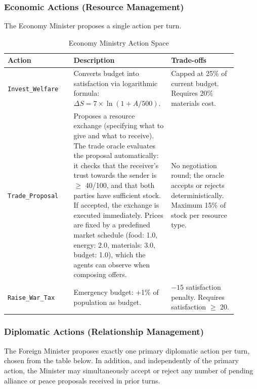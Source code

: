 \subsubsection{Economic Actions (Resource Management)}
The Economy Minister proposes a single action per turn.
\begin{table}[H]
\centering
\begin{tabular}{|p{0.27\linewidth}|p{0.36\linewidth}|p{0.27\linewidth}|}
\hline
\textbf{Action} & \textbf{Description} & \textbf{Trade-offs} \\ \hline
\texttt{Invest\_Welfare} & Converts budget into satisfaction via logarithmic formula: $\Delta S = 7 \times \ln(1 + A/500)$. & Capped at 25\% of current budget. Requires 20\% materials cost. \\ \hline
\texttt{Trade\_Proposal} & Proposes a resource exchange (specifying what to give and what to receive). The trade oracle evaluates the proposal automatically: it checks that the receiver's trust towards the sender is $\geq$ 40/100, and that both parties have sufficient stock. If accepted, the exchange is executed immediately. Prices are fixed by a predefined market schedule (food: 1.0, energy: 2.0, materials: 3.0, budget: 1.0), which the agents can observe when composing offers. & No negotiation round; the oracle accepts or rejects deterministically. Maximum 15\% of stock per resource type. \\ \hline
\texttt{Raise\_War\_Tax} & Emergency budget: +1\% of population as budget. & $-15$ satisfaction penalty. Requires satisfaction $\geq$ 20. \\ \hline
\end{tabular}
\caption{Economy Ministry Action Space}
\label{tab:economy_actions}
\end{table}

\subsubsection{Diplomatic Actions (Relationship Management)}
The Foreign Minister proposes exactly one primary diplomatic action per turn, chosen from the table below. In addition, and independently of the primary action, the Minister may simultaneously accept or reject any number of pending alliance or peace proposals received in prior turns.

